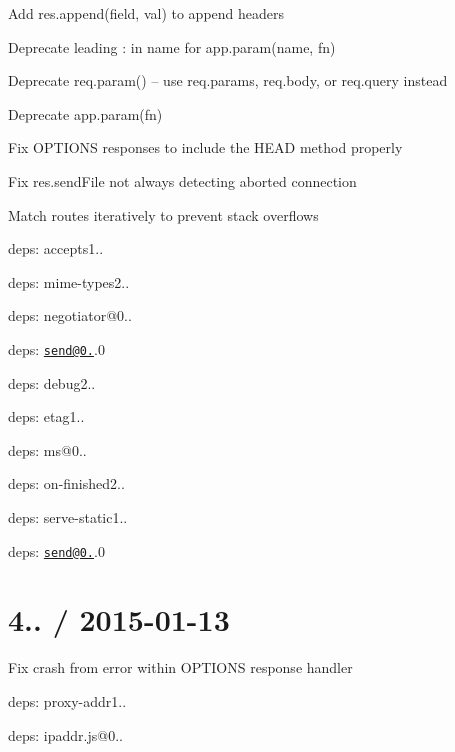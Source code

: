 \begin{DoxyItemize}
\item Add {\ttfamily res.\+append(field, val)} to append headers
\item Deprecate leading {\ttfamily \+:} in {\ttfamily name} for {\ttfamily app.\+param(name, fn)}
\item Deprecate {\ttfamily req.\+param()} -- use {\ttfamily req.\+params}, {\ttfamily req.\+body}, or {\ttfamily req.\+query} instead
\item Deprecate {\ttfamily app.\+param(fn)}
\item Fix {\ttfamily O\+P\+T\+I\+O\+N\+S} responses to include the {\ttfamily H\+E\+A\+D} method properly
\item Fix {\ttfamily res.\+send\+File} not always detecting aborted connection
\item Match routes iteratively to prevent stack overflows
\item deps\+: accepts1..
\begin{DoxyItemize}
\item deps\+: mime-\/types2..
\item deps\+: negotiator@0..
\end{DoxyItemize}
\item deps\+: \href{mailto:send@0.11}{\tt send@0.}.0
\begin{DoxyItemize}
\item deps\+: debug2..
\item deps\+: etag1..
\item deps\+: ms@0..
\item deps\+: on-\/finished2..
\end{DoxyItemize}
\item deps\+: serve-\/static1..
\begin{DoxyItemize}
\item deps\+: \href{mailto:send@0.11}{\tt send@0.}.0
\end{DoxyItemize}
\end{DoxyItemize}

\section*{4.. / 2015-\/01-\/13 }


\begin{DoxyItemize}
\item Fix crash from error within {\ttfamily O\+P\+T\+I\+O\+N\+S} response handler
\item deps\+: proxy-\/addr1..
\begin{DoxyItemize}
\item deps\+: ipaddr.\+js@0..
\end{DoxyItemize}
\end{DoxyItemize}

